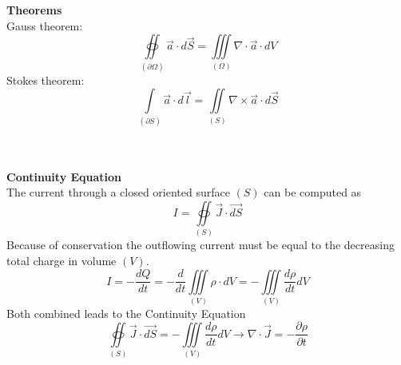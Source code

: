 \textbf{\\ \\ Theorems\\}
	Gauss theorem:
	\begin{equation*}
		\oiint\limits_{\left(\partial \Omega\right)} \vec{a} \cdot d\vec{S} = \iiint\limits_{\left(\Omega\right)} \nabla \cdot \vec{a} \cdot dV
	\end{equation*}
	Stokes theorem:
	\begin{equation*}
		\int\limits_{\left(\partial S\right)} \vec{a} \cdot d\vec{l} = \iint\limits_{\left(S\right)} \nabla \times \vec{a} \cdot d\vec{S}
	\end{equation*}
	
\textbf{\\ \\Continuity Equation\\}
	The current through a closed oriented surface $(S)$ can be computed as
	\begin{equation*}
		I = \oiint\limits_{\left(S\right)} \vec{J} \cdot \vec{dS}
	\end{equation*}
	Because of conservation the outflowing current must be equal to the decreasing total charge in volume $(V)$.
	\begin{equation*}
		I = -\frac{dQ}{dt} = -\frac{d}{dt}\iiint\limits_{\left(V\right)} \rho \cdot dV = -\iiint\limits_{\left(V\right)} \frac{d \rho}{dt}dV
	\end{equation*}
	Both combined leads to the Continuity Equation
	\begin{equation*}
		\oiint\limits_{\left(S\right)} \vec{J} \cdot \vec{dS} = - \iiint\limits_{\left(V\right)} \frac{d\rho}{dt}dV \rightarrow \nabla \cdot \vec{J} = -\frac{\partial \rho}{\partial t}
	\end{equation*}

